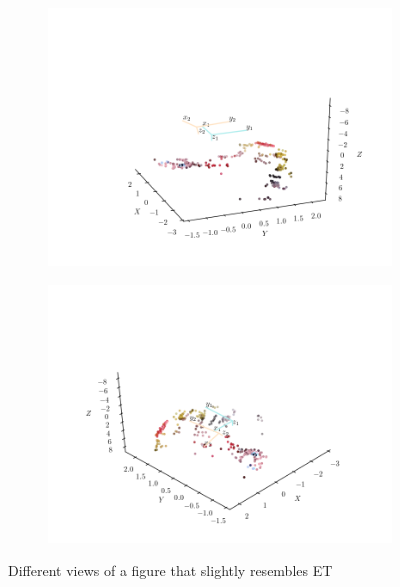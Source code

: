 \begin{homeworkProblem}
\begin{figure}[H]
\begin{subfigure}{0.49\textwidth}
          \includegraphics[width=1.3\linewidth]{./images/ang_5.png}
      \end{subfigure}
      \begin{subfigure}{0.49\textwidth}
          \includegraphics[width=1.3\linewidth]{./images/ang_6.png}
      \end{subfigure}
      \caption{Different views of a figure that slightly resembles ET}
    \end{figure}
\end{homeworkProblem}

\pagebreak

